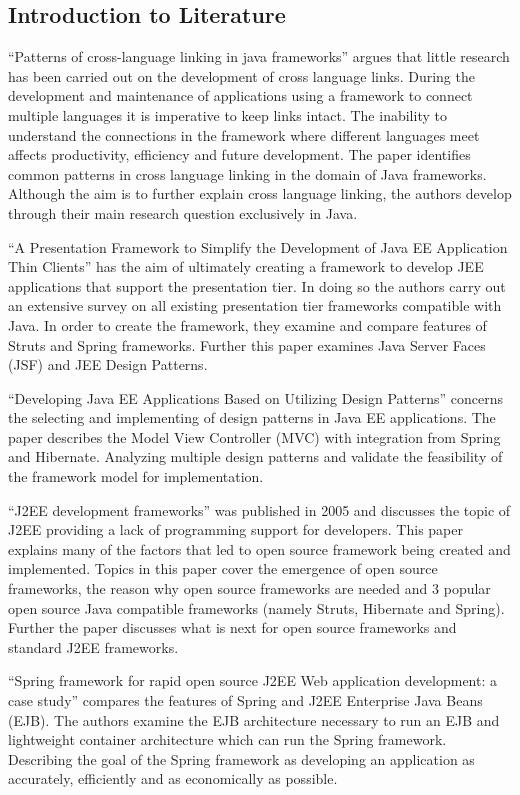 	\subsection{Introduction to Literature}
	“Patterns of cross-language linking in java frameworks” argues that little research has been carried out on the development of cross language links. During the development and maintenance of applications using a framework to connect multiple languages it is imperative to keep links intact. The inability to understand the connections in the framework where different languages meet affects productivity, efficiency and future development. The paper identifies common patterns in cross language linking in the domain of Java frameworks. Although the aim is to further explain cross language linking, the authors develop through their main research question exclusively in Java.
	
	“A Presentation Framework to Simplify the Development of Java EE Application Thin Clients” has the aim of ultimately creating a framework to develop JEE applications that support the presentation tier. In doing so the authors carry out an extensive survey on all existing presentation tier frameworks compatible with Java. In order to create the framework, they examine and compare features of Struts and Spring frameworks. Further this paper examines Java Server Faces (JSF) and JEE Design Patterns.
	
	“Developing Java EE Applications Based on Utilizing Design Patterns” concerns the selecting and implementing of design patterns in Java EE applications. The paper describes the Model View Controller (MVC) with integration from Spring and Hibernate. Analyzing multiple design patterns and validate the feasibility of the framework model for implementation.
	
	“J2EE development frameworks” was published in 2005 and discusses the topic of J2EE providing a lack of programming support for developers. This paper explains many of the factors that led to open source framework being created and implemented. Topics in this paper cover the emergence of open source frameworks, the reason why open source frameworks are needed and 3 popular open source Java compatible frameworks (namely Struts, Hibernate and Spring). Further the paper discusses what is next for open source frameworks and standard J2EE frameworks.
	
	“Spring framework for rapid open source J2EE Web application development: a case study” compares the features of Spring and J2EE Enterprise Java Beans (EJB). The authors examine the EJB architecture necessary to run an EJB and lightweight container architecture which can run the Spring framework. Describing the goal of the Spring framework as developing an application as accurately, efficiently and as economically as possible.
	
